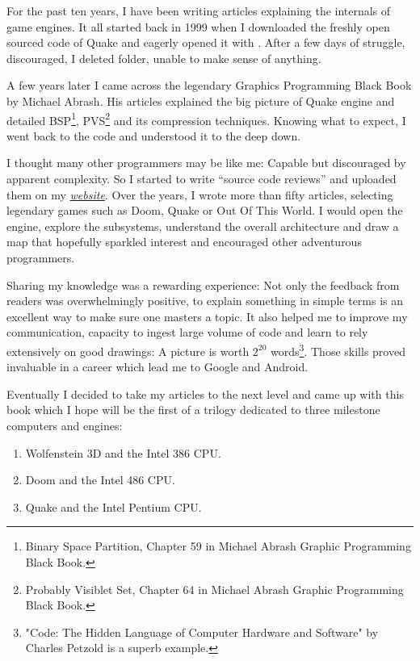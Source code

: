 \documentclass[book.tex]{subfiles}
\begin{document}
For the past ten years, I have been writing articles explaining the internals of game engines. It all started back in 1999 when I downloaded the freshly open sourced code of \mbox{Quake} and eagerly opened it with . After a few days of struggle, discouraged, I deleted  folder, unable to make sense of anything.

\bigskip

A few years later I came across the legendary Graphics Programming Black Book by Michael Abrash. His articles explained the big picture of Quake engine and detailed BSP\footnote{Binary Space Partition, Chapter 59 in Michael Abrash Graphic Programming Black Book.}, PVS\footnote{Probably Visiblet Set, Chapter 64 in Michael Abrash Graphic Programming Black Book.} and its compression techniques. Knowing what to expect, I went back to the code and understood it to the deep down.

\bigskip

I thought many other programmers may be like me: Capable but discouraged by apparent complexity. So I started to write ``source  code reviews'' and uploaded them on my
\href{http://fabiensanglard.net}{\textit{website}}. Over the years, I wrote more than fifty articles, selecting legendary games such as Doom, Quake or Out Of This World. I would open the engine, explore the subsystems, understand the overall architecture and draw a map that hopefully sparkled interest and encouraged other adventurous programmers.

\bigskip

Sharing my knowledge was a rewarding experience: Not only the feedback from readers was overwhelmingly positive, to explain something in simple terms is an excellent way to make sure one masters a topic. It also helped me to improve my communication, capacity to ingest large volume of code and learn to rely extensively on good drawings: A picture
is worth $2^{20}$ words\footnote{"Code: The Hidden Language of Computer Hardware and Software" by Charles Petzold is a superb example.}. Those skills proved invaluable in a career which lead me to Google and Android.

\bigskip

Eventually I decided to take my articles to the next level and came up with this book which I hope will be the first of a trilogy dedicated to three milestone computers and engines:

\begin{enumerate}
\item Wolfenstein 3D and the Intel 386 CPU.
\item Doom and the Intel 486 CPU.
\item Quake and the Intel Pentium CPU.
\end{enumerate}
\end{document}
